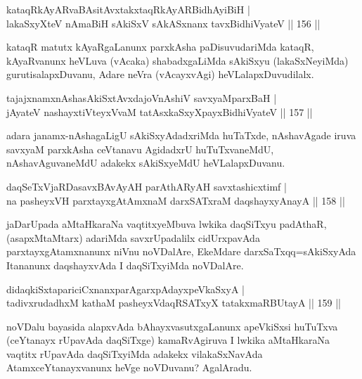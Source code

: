 \begin{shl}
kataqRkAyARvaBAsitAvxtakxtaqRkAyARBidhAyiBiH |\\
lakaSxyXteV nAmaBiH sAkiSxV sAkASxnanx tavxBidhiVyateV \hfill || 156 ||
\end{shl}

\begin{artha}
kataqR matutx kAyaRgaLanunx parxkAsha paDisuvudariMda kataqR, kAyaRvanunx heVLuva (vAcaka) shabadxgaLiMda sAkiSxyu (lakaSxNeyiMda) gurutisalapxDuvanu, Adare neVra (vAcayxvAgi) heVLalapxDuvudilalx.
\end{artha}

\begin{shl}
tajajxnamxnAshasAkiSxtAvxdajoV\s nAshiV savxyaMparxBaH |\\
jAyateV nashayxtiVteyxVvaM tatAsxkaSxyXpayxBidhiVyateV \hfill || 157 ||
\end{shl}

\begin{artha}
adara janamx-nAshagaLigU sAkiSxyAdadxriMda huTaTxde, nAshavAgade iruva savxyaM parxkAsha ceVtanavu AgidadxrU huTuTxvaneMdU, nAshavAguvaneMdU adakekx sAkiSxyeMdU heVLalapxDuvanu.
\end{artha}


\begin{shl}
daqSeTxVjaRDasavxBAvAyAH parAthARyAH savxtashicxtimf |\\
na pasheyxVH parxtayxgAtAmxnaM darxSATxraM daqshayxyA\s nayA \hfill || 158 ||
\end{shl}

\begin{artha}
jaDarUpada aMtaHkaraNa vaqtitxyeMbuva lwkika daqSiTxyu padAthaR, (asapxMtaMtarx) adariMda savxrUpadalilx cidUrxpavAda parxtayxgAtamxnanunx niVnu noVDalAre, EkeMdare darxSaTxqq=sAkiSxyAda Itananunx daqshayxvAda I daqSiTxyiMda noVDalAre.
\end{artha}


\begin{shl}
didaqkiSxtapariciCxnanxparAgarxpAdayxpeVkaSxyA |\\
tadivxrudadhxM kathaM pasheyxVdaqRSATxyX tatakxmaRBUtayA \hfill || 159 ||
\end{shl}

\begin{artha}%
noVDalu bayasida alapxvAda bAhayxvasutxgaLanunx apeVkiSxsi huTuTxva (ceYtanayx rUpavAda daqSiTxge) kamaRvAgiruva I lwkika aMtaHkaraNa vaqtitx rUpavAda daqSiTxyiMda adakekx vilakaSxNavAda AtamxceYtanayxvanunx heVge noVDuvanu? AgalAradu.
\end{artha}

